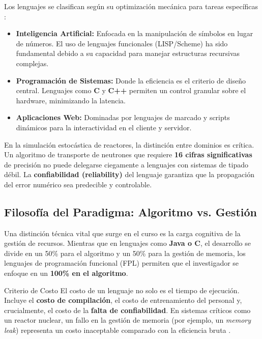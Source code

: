 Los lenguajes se clasifican según su optimización mecánica para tareas específicas \cite{sebesta2019concepts}:

\begin{itemize}
    \item \textbf{Inteligencia Artificial:} Enfocada en la manipulación de símbolos en lugar de números. El uso de lenguajes funcionales (LISP/Scheme) ha sido fundamental debido a su capacidad para manejar estructuras recursivas complejas.
    \item \textbf{Programación de Sistemas:} Donde la eficiencia es el criterio de diseño central. Lenguajes como \textbf{C} y \textbf{C++} permiten un control granular sobre el hardware, minimizando la latencia.
    \item \textbf{Aplicaciones Web:} Dominadas por lenguajes de marcado y scripts dinámicos para la interactividad en el cliente y servidor.
\end{itemize}

\begin{fisicaconexion}{}
En la simulación estocástica de reactores, la distinción entre dominios es crítica. Un algoritmo de transporte de neutrones que requiere \textbf{16 cifras significativas} de precisión no puede delegarse ciegamente a lenguajes con sistemas de tipado débil. La \textbf{confiabilidad (reliability)} del lenguaje garantiza que la propagación del error numérico sea predecible y controlable.
\end{fisicaconexion}

\subsection{Filosofía del Paradigma: Algoritmo vs. Gestión}

Una distinción técnica vital que surge en el curso es la carga cognitiva de la gestión de recursos. Mientras que en lenguajes como \textbf{Java o C}, el desarrollo se divide en un 50\% para el algoritmo y un 50\% para la gestión de memoria, los lenguajes de programación funcional (FPL) permiten que el investigador se enfoque en un \textbf{100\% en el algoritmo}.

\begin{ejemplo}{Criterio de Costo}
El costo de un lenguaje no solo es el tiempo de ejecución. Incluye el \textbf{costo de compilación}, el costo de entrenamiento del personal y, crucialmente, el costo de la \textbf{falta de confiabilidad}. En sistemas críticos como un reactor nuclear, un fallo en la gestión de memoria (por ejemplo, un \textit{memory leak}) representa un costo inaceptable comparado con la eficiencia bruta \cite{sebesta2019concepts}.
\end{ejemplo}


